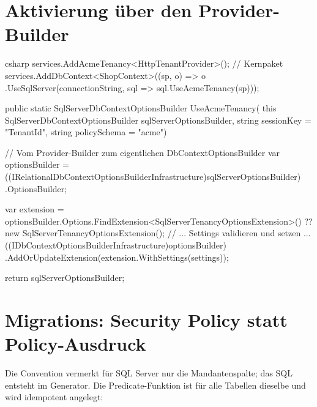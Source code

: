 \section{Aktivierung über den Provider-Builder}

\begin{sourcecode}{csharp}
services.AddAcmeTenancy<HttpTenantProvider>();                    // Kernpaket
services.AddDbContext<ShopContext>((sp, o) => o
    .UseSqlServer(connectionString, sql => sql.UseAcmeTenancy(sp)));

public static SqlServerDbContextOptionsBuilder UseAcmeTenancy(
    this SqlServerDbContextOptionsBuilder sqlServerOptionsBuilder,
    string sessionKey = "TenantId",
    string policySchema = "acme")
{
    // Vom Provider-Builder zum eigentlichen DbContextOptionsBuilder
    var optionsBuilder =
        ((IRelationalDbContextOptionsBuilderInfrastructure)sqlServerOptionsBuilder)
        .OptionsBuilder;

    var extension = optionsBuilder.Options.FindExtension<SqlServerTenancyOptionsExtension>()
                    ?? new SqlServerTenancyOptionsExtension();
    // ... Settings validieren und setzen ...
    ((IDbContextOptionsBuilderInfrastructure)optionsBuilder)
        .AddOrUpdateExtension(extension.WithSettings(settings));

    return sqlServerOptionsBuilder;
}
\end{sourcecode}

\section{Migrations: Security Policy statt Policy-Ausdruck}

Die Convention vermerkt für SQL Server nur die Mandantenspalte; das SQL entsteht im
Generator. Die Predicate-Funktion ist für alle Tabellen dieselbe und wird idempotent
angelegt:

